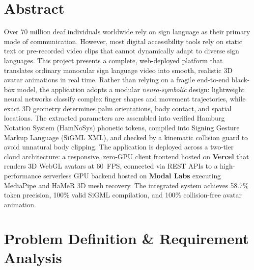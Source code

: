 \documentclass[11pt, a4paper]{article}
\begin{document}
\section{Abstract}
\noindent
Over 70 million deaf individuals worldwide rely on sign language as their primary mode of communication. However, most digital accessibility tools rely on static text or pre-recorded video clips that cannot dynamically adapt to diverse sign languages. This project presents a complete, web-deployed platform that translates ordinary monocular sign language video into smooth, realistic 3D avatar animations in real time. Rather than relying on a fragile end-to-end black-box model, the application adopts a modular \emph{neuro-symbolic} design: lightweight neural networks classify complex finger shapes and movement trajectories, while exact 3D geometry determines palm orientations, body contact, and spatial locations. The extracted parameters are assembled into verified Hamburg Notation System (HamNoSys) phonetic tokens, compiled into Signing Gesture Markup Language (SiGML XML), and checked by a kinematic collision guard to avoid unnatural body clipping. The application is deployed across a two-tier cloud architecture: a responsive, zero-GPU client frontend hosted on \textbf{Vercel} that renders 3D WebGL avatars at 60~FPS, connected via REST APIs to a high-performance serverless GPU backend hosted on \textbf{Modal Labs} executing MediaPipe and HaMeR 3D mesh recovery. The integrated system achieves 58.7\% token precision, 100\% valid SiGML compilation, and 100\% collision-free avatar animation.

\section{Problem Definition \& Requirement Analysis}
\end{document}
